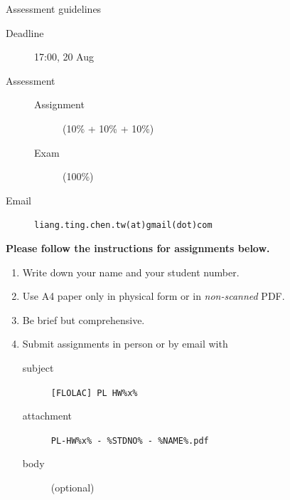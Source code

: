\begin{frame}[fragile]{Assessment guidelines}
  \begin{description}
    \item[Deadline] 17:00, 20 Aug
    \item[Assessment] 
      \begin{description}
        \item[Assignment] (10\% + 10\% + 10\%)
        \item[Exam] (100\%)
      \end{description}
    \item[Email] \texttt{liang.ting.chen.tw(at)gmail(dot)com}
  \end{description}

  \textbf{Please follow the instructions for assignments below.}

  \begin{enumerate}
    \item Write down your name and your student number. 
    \item Use A4 paper only in physical form or in \emph{non-scanned} PDF. 
    \item Be brief but comprehensive.
    \item Submit assignments in person or by email with 
      \begin{description}
        \item[subject] \texttt{[FLOLAC] PL HW\%x\%}
        \item[attachment] \texttt{PL-HW\%x\% - \%STDNO\% - \%NAME\%.pdf}
        \item[body] (optional)
      \end{description}
  \end{enumerate}
\end{frame}

